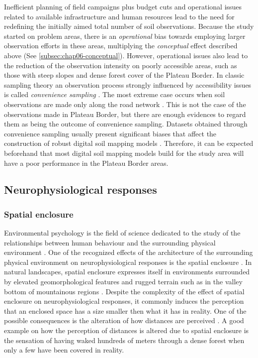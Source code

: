 Inefficient planning of field campaigns plus budget cuts and operational issues related to available 
infrastructure and human resources lead to the need for redefining the initially aimed total number of soil 
observations. Because the study started on problem areas, there is an \emph{operational} bias towards employing
larger observation efforts in these areas, multiplying the \emph{conceptual} effect described above (See 
\autoref{subsec:chap06-conceptual}). However, operational issues also lead to the reduction of the 
observation intensity on poorly accessible areas, such as those with steep slopes and dense forest cover of the 
Plateau Border. In classic sampling theory an observation process strongly influenced by accessibility issues 
is called \emph{convenience sampling} \cite{deGruijterEtAl2006}. The most extreme case occurs when soil 
observations are made only along the road network \cite{CambuleEtAl2013}. This is not the case of the 
observations made in Plateau Border, but there are enough evidences to regard them as being the outcome of 
convenience sampling. Datasets obtained through convenience sampling usually present significant biases that 
affect the construction of robust digital soil mapping models \cite{BrusEtAl2011}. Therefore, it can be 
expected beforehand that most digital soil mapping models build for the study area will have a poor performance 
in the Plateau Border areas.

\subsection{Neurophysiological responses}

\subsubsection{Spatial enclosure}

Environmental psychology is the field of science dedicated to the study of the relationships between human 
behaviour and the surrounding physical environment \cite{BonnesEtAl2002}. One of the recognized effects of the 
architecture of the surrounding physical environment on neurophysiological responses is the spatial enclosure 
\cite{EpsteinEtAl1998}. In natural landscapes, spatial enclosure expresses itself in environments surrounded by
elevated geomorphological features and rugged terrain such as in the valley bottom of mountainous regions 
\cite{StampsEtAl2004}. Despite the complexity of the effect of spatial enclosure on neurophysiological 
responses, it commonly induces the perception that an enclosed space has a size smaller then what it has in 
reality. One of the possible consequences is the alteration of how distances are perceived 
\cite{Coeterier1994}. A good example on how the perception of distances is altered due to spatial enclosure is 
the sensation of having waked hundreds of meters through a dense forest when only a few have been covered in 
reality.

